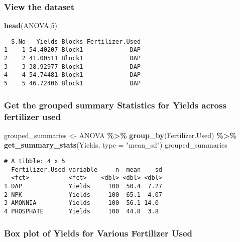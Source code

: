 \documentclass[
]{article}
\newenvironment{Shaded}{\begin{snugshade}}{\end{snugshade}}
\newcommand{\AttributeTok}[1]{\textcolor[rgb]{0.13,0.29,0.53}{#1}}
\newcommand{\DecValTok}[1]{\textcolor[rgb]{0.00,0.00,0.81}{#1}}
\newcommand{\FunctionTok}[1]{\textcolor[rgb]{0.13,0.29,0.53}{\textbf{#1}}}
\newcommand{\NormalTok}[1]{#1}
\newcommand{\OtherTok}[1]{\textcolor[rgb]{0.56,0.35,0.01}{#1}}
\newcommand{\SpecialCharTok}[1]{\textcolor[rgb]{0.81,0.36,0.00}{\textbf{#1}}}
\newcommand{\StringTok}[1]{\textcolor[rgb]{0.31,0.60,0.02}{#1}}
\begin{document}
\hypertarget{view-the-dataset}{%
\subsubsection{View the dataset}\label{view-the-dataset}}

\begin{Shaded}
\begin{Highlighting}[]
\FunctionTok{head}\NormalTok{(ANOVA,}\DecValTok{5}\NormalTok{)}
\end{Highlighting}
\end{Shaded}

\begin{verbatim}
  S.No   Yields Blocks Fertilizer.Used
1    1 54.40207 Block1             DAP
2    2 41.00511 Block1             DAP
3    3 38.92977 Block1             DAP
4    4 54.74481 Block1             DAP
5    5 46.72406 Block1             DAP
\end{verbatim}

\hypertarget{get-the-grouped-summary-statistics-for-yields-across-fertilizer-used}{%
\subsubsection{Get the grouped summary Statistics for Yields across
fertilizer
used}\label{get-the-grouped-summary-statistics-for-yields-across-fertilizer-used}}

\begin{Shaded}
\begin{Highlighting}[]
\NormalTok{grouped\_summaries }\OtherTok{\textless{}{-}}\NormalTok{ ANOVA }\SpecialCharTok{\%\textgreater{}\%}
  \FunctionTok{group\_by}\NormalTok{(Fertilizer.Used) }\SpecialCharTok{\%\textgreater{}\%}
  \FunctionTok{get\_summary\_stats}\NormalTok{(Yields, }\AttributeTok{type =} \StringTok{"mean\_sd"}\NormalTok{)}
\NormalTok{grouped\_summaries}
\end{Highlighting}
\end{Shaded}

\begin{verbatim}
# A tibble: 4 x 5
  Fertilizer.Used variable     n  mean    sd
  <fct>           <fct>    <dbl> <dbl> <dbl>
1 DAP             Yields     100  50.4  7.27
2 NPK             Yields     100  65.1  4.07
3 AMONNIA         Yields     100  56.1 14.0 
4 PHOSPHATE       Yields     100  44.8  3.8 
\end{verbatim}

\hypertarget{box-plot-of-yields-for-various-fertilizer-used}{%
\subsubsection{Box plot of Yields for Various Fertilizer
Used}\label{box-plot-of-yields-for-various-fertilizer-used}}
\end{document}
